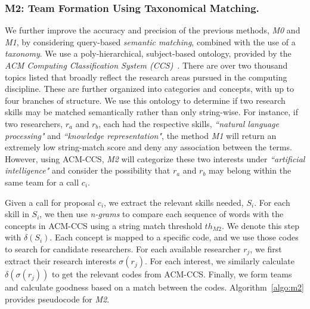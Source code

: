 \subsubsection{M2: Team Formation Using Taxonomical Matching.}
We further improve the accuracy and precision of the previous methods, {\it M0} and {\it M1}, by considering query-based \textit{semantic matching}, combined with the use of a \textit{taxonomy}. We use a poly-hierarchical, subject-based ontology, provided by the \textit{ACM Computing Classification System (CCS)}~\cite{acm2012acm}. There are over two thousand topics listed that broadly reflect the research areas pursued in the computing discipline. These are further organized into categories and concepts, with up to four branches of structure. We use this ontology to determine if two research skills may be matched semantically rather than only string-wise. For instance, if two researchers, $r_a$ and $r_b$, each had the respective skills, \textit{``natural language processing"} and \textit{``knowledge representation"}, the method {\it M1} will return an extremely low string-match score and deny any association between the terms. However, using ACM-CCS, {\it M2} will categorize these two interests under \textit{``artificial intelligence"} and consider the possibility that $r_a$ and $r_b$ may belong within the same team for a call $c_i$. 

Given a call for proposal $c_i$, we extract the relevant skills needed, $S_i$. For each skill in $S_i$, we then use \textit{n-grams} to compare each sequence of words with the concepts in ACM-CCS using a string match threshold $th_{M2}$. We denote this step with $\delta(S_i)$. Each concept is mapped to a specific code, and we use those codes to search for candidate researchers. For each available researcher $r_j$, we first extract their research interests $\sigma(r_j)$. For each interest, we similarly calculate $\delta(\sigma(r_j))$ to get the relevant codes from ACM-CCS. Finally, we form teams and calculate goodness based on a match between the codes. Algorithm~\ref{algo:m2} provides pseudocode for {\it M2}.

